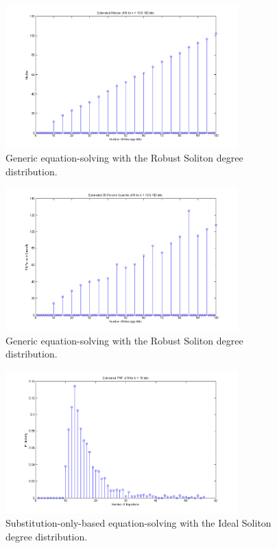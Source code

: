 \documentclass[11pt]{article}
\begin{document}
\begin{enumerate}
    \begin{figure}[H]
        \begin{center}
            \includegraphics[width = 0.8\textwidth]{figure_1b_median_robust.png}
            \caption{Generic equation-solving with the Robust Soliton degree distribution.}
        \end{center}
    \end{figure}

    \begin{figure}[H]
        \begin{center}
            \includegraphics[width = 0.8\textwidth]{figure_1b_90_percent_quantile_robust.png}
            \caption{Generic equation-solving with the Robust Soliton degree distribution.}
        \end{center}
    \end{figure}

    \begin{figure}[H]
        \begin{center}
            \includegraphics[width = 0.8\textwidth]{figure_1c_k10_ideal.png}
            \caption{Substitution-only-based equation-solving with the Ideal Soliton degree distribution.}
        \end{center}
    \end{figure}


\end{enumerate}
\end{document}
